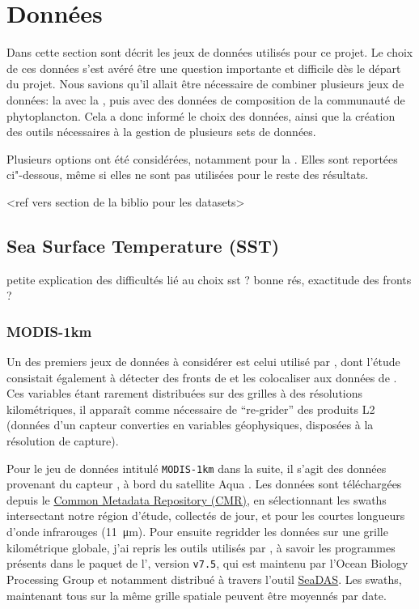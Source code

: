
\label{chp:methodes}

\minitoc%

\section{Données}
\label{sec:donnees}

Dans cette section sont décrit les jeux de données utilisés pour ce projet.
Le choix de ces données s'est avéré être une question importante et difficile dès le départ du projet.
Nous savions qu'il allait être nécessaire de combiner plusieurs jeux de données: la  avec la , puis avec des données de composition de la communauté de phytoplancton.
Cela a donc informé le choix des données, ainsi que la création des outils nécessaires à la gestion de plusieurs sets de données.

Plusieurs options ont été considérées, notamment pour la .
Elles sont reportées ci"-dessous, même si elles ne sont pas utilisées pour le reste des résultats.

<ref vers section de la biblio pour les datasets>


\subsection{Sea Surface Temperature (SST)}
\label{sec:donnees-sst}

petite explication des difficultés lié au choix sst ?
bonne rés, exactitude des fronts ?

\subsubsection{MODIS-1km}

Un des premiers jeux de données  à considérer est celui utilisé par \textcite{liu_2016}, dont l'étude consistait également à détecter des fronts de  et les colocaliser aux données de .
Ces variables étant rarement distribuées sur des grilles à des résolutions kilométriques, il apparaît comme nécessaire de \enquote{re-grider} des produits L2 (données d'un capteur converties en variables géophysiques, disposées à la résolution de capture).

Pour le jeu de données intitulé \verb|MODIS-1km| dans la suite, il s'agit des données provenant du capteur , à bord du satellite Aqua \parencite{kilpatrick_2015}.
Les données sont téléchargées depuis le \href{https://cmr.earthdata.nasa.gov/search/}{Common Metadata Repository (CMR)}, en sélectionnant les swaths intersectant notre région d'étude, collectés de jour, et pour les courtes longueurs d'onde infrarouges (\qty{11}{\um}).
Pour ensuite regridder les données sur une grille kilométrique globale, j'ai repris les outils utilisés par \textcite{liu_2016}, à savoir les programmes présents dans le paquet de l'\href{https://oceandata.sci.gsfc.nasa.gov/ocssw}{}, version \verb|v7.5|, qui est maintenu par l'Ocean Biology Processing Group et notamment distribué à travers l'outil \href{https://seadas.gsfc.nasa.gov/}{SeaDAS}.
Les swaths, maintenant tous sur la même grille spatiale peuvent être moyennés par date.

